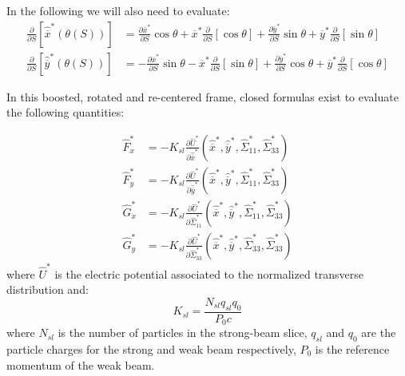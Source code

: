 In the following we will also need to evaluate:
\begin{align}
\frac{\partial }{\partial S} \left[\hat{\overline{x}}^*\left(\theta (S)\right) \right] &= 
 \frac{\partial \overline{x}^* }{\partial S}  \cos \theta
+ \overline{x}^*  \frac{\partial }{\partial S} \left[ \cos \theta \right] 
+ \frac{\partial \overline{y}^* }{\partial S}  \sin \theta
+ \overline{y}^*\frac{\partial }{\partial S} \left[ \sin \theta \right]  \\
\frac{\partial }{\partial S} \left[\hat{\overline{y}}^*\left(\theta (S)\right) \right] &= 
- \frac{\partial \overline{x}^* }{\partial S}  \sin \theta
-\overline{x}^*  \frac{\partial }{\partial S} \left[ \sin \theta \right] 
+  \frac{\partial \overline{y}^* }{\partial S}  \cos \theta
+ \overline{y}^*\frac{\partial }{\partial S} \left[ \cos \theta \right]  
\end{align}



In this boosted, rotated and re-centered frame, closed formulas exist to evaluate the following quantities:

\begin{align}
\hat{F}^*_x &= -K_{sl} \frac{\partial \hat{U}^*}{\partial \hat{\overline{x}}^*}\left(\hat{\overline{x}}^*, \hat{\overline{y}}^* , \hat{\Sigma}^*_{11}, \hat{\Sigma}^*_{33}\right) \label{eq:firstf}\\
%
\hat{F}^*_y &= -K_{sl}\frac{\partial \hat{U}^*}{\partial \hat{\overline{y}}^*}\left(\hat{\overline{x}}^*, \hat{\overline{y}}^* , \hat{\Sigma}^*_{11}, \hat{\Sigma}^*_{33}\right)\\
%
\hat{G}^*_x &= -K_{sl}\frac{\partial \hat{U}^*}{\partial \hat{\Sigma}^*_{11}}\left(\hat{\overline{x}}^*, \hat{\overline{y}}^* , \hat{\Sigma}^*_{11}, \hat{\Sigma}^*_{33}\right)\\
%
\hat{G}^*_y &= -K_{sl}\frac{\partial \hat{U}^*}{\partial \hat{\Sigma}^*_{33}}\left(\hat{\overline{x}}^*, \hat{\overline{y}}^* , \hat{\Sigma}^*_{33}, \hat{\Sigma}^*_{33} \right) \label{eq:lastf}
\end{align}
where $\hat{U}^*$ is the electric potential associated to the normalized transverse distribution and:
\begin{equation}
K_{sl} = \frac{N_{sl} q_{sl} q_0}{P_0 c}
\label{eq:factor}
\end{equation}
where $N_{sl}$ is the number of particles in the strong-beam slice, $q_{sl}$ and $q_0$ are the particle charges for the strong and weak beam respectively, $P_0$ is the reference momentum of the weak beam.

